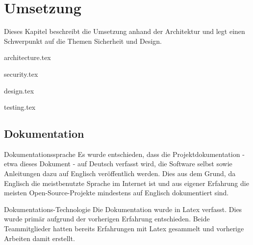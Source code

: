 \begin{comment}
(Implementierung) Architektur und Design beschrieben: Mit begründeten Architekturentscheidungen, mit Diskussion, wie Qualitätsattribute sichergestellt wurden (welche Qualität wurde erreicht?), mit Dokumentation, welche Experimente/Tests durchgeführt wurden und welche Lösungsoptionen aufgrund der Ergebnisse dieser Experimente/Tests
verworfen wurden (was ging schief?)
\end{comment}

\chapter{Umsetzung}
Dieses Kapitel beschreibt die Umsetzung anhand der Architektur und legt einen Schwerpunkt auf die Themen Sicherheit und Design.

{architecture.tex}

\clearpage
{security.tex}

\clearpage
{design.tex}

\clearpage
{testing.tex}

\section{Dokumentation}

\begin{decision}{Dokumentationssprache}
Es wurde entschieden, dass die Projektdokumentation - etwa dieses Dokument - auf Deutsch verfasst wird, die Software selbst sowie Anleitungen dazu auf Englisch veröffentlich werden. Dies aus dem Grund, da Englisch die meistbenutzte Sprache im Internet ist \cite{websitelanguages} und aus eigener Erfahrung die meisten Open-Source-Projekte mindestens auf Englisch dokumentiert sind.
\end{decision}

\begin{decision}{Dokumentations-Technologie}
Die Dokumentation wurde in Latex verfasst. Dies wurde primär aufgrund der vorherigen Erfahrung entschieden. Beide Teammitglieder hatten bereits Erfahrungen mit Latex gesammelt und vorherige Arbeiten damit erstellt.
\end{decision}